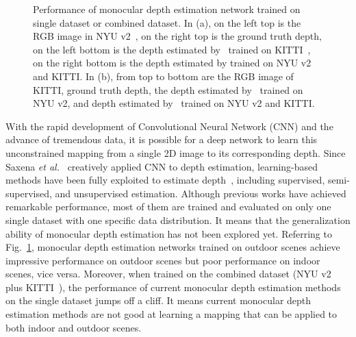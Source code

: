 \documentclass{svjour3}                     %
\begin{document}
\begin{figure}[tbp]
  \centering
  \hspace{0.5cm}
  \caption{
  Performance of monocular depth estimation network trained on single dataset or combined dataset. In (a), on the left top is the RGB image in NYU v2~\cite{Silberman:ECCV12}, on the right top is the ground truth depth, on the left bottom is the depth estimated by~\cite{DABC} trained on KITTI~\cite{geiger2013vision}, on the right bottom is the depth estimated by trained on NYU v2 and KITTI. In (b), from top to bottom are the RGB image of KITTI, ground truth depth, the depth estimated by~\cite{bts} trained on NYU v2, and depth estimated by~\cite{bts} trained on NYU v2 and KITTI.}
\label{train_once_problem}
\end{figure}

With the rapid development of Convolutional Neural Network (CNN) and the advance of tremendous data, it is possible for a deep network to learn this unconstrained mapping from a single 2D image to its corresponding depth. Since Saxena \textit{et al.}~\cite{saxena2006learning} creatively applied CNN to depth estimation, learning-based methods have been fully exploited to estimate depth~\cite{FuCVPR18-DORN,godard2017unsupervised,Godard_2019_ICCV,lee2019monocular,zhou2017unsupervised,eigen2014depth,bts,xu2018structured}, including supervised, semi-supervised, and unsupervised estimation. Although previous works have achieved remarkable performance, most of them are trained and evaluated on only one single dataset with one specific data distribution. It means that the generalization ability of monocular depth estimation has not been explored yet. Referring to Fig.~\ref{train_once_problem}, monocular depth estimation networks trained on outdoor scenes achieve impressive performance on outdoor scenes but poor performance on indoor scenes, vice versa. Moreover, when trained on the combined dataset (NYU v2 ~\cite{Silberman:ECCV12} plus KITTI~\cite{geiger2013vision}), the performance of current monocular depth estimation methods on the single dataset jumps off a cliff. It means current monocular depth estimation methods are not good at learning a mapping that can be applied to both indoor and outdoor scenes.
\end{document}
